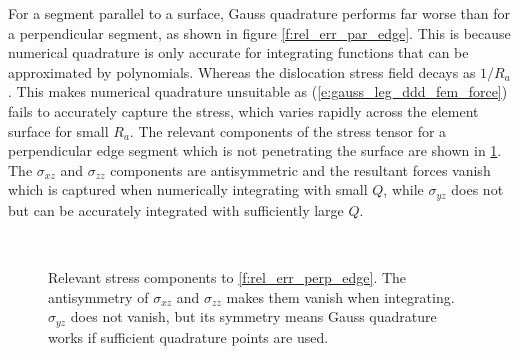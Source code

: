 \documentclass[11pt]{iopart}
\begin{document}
For a segment parallel to a surface, Gauss quadrature performs far worse than for a perpendicular segment, as shown in figure \ref{f:rel_err_par_edge}. This is because numerical quadrature is only accurate for integrating functions that can be approximated by polynomials. Whereas the dislocation stress field \cite{Cai2006} decays as $1/R_{a}$. This makes numerical quadrature unsuitable as (\ref{e:gauss_leg_ddd_fem_force}) fails to accurately capture the stress, which varies rapidly across the element surface for small $R_a$. The relevant components of the stress tensor for a perpendicular edge segment which is not penetrating the surface are shown in \cref{f:sigma_perp_edge}. The $\sigma_{xz}$ and $\sigma_{zz}$ components are antisymmetric and the resultant forces vanish which is captured when numerically integrating with small $Q$, while $\sigma_{yz}$ does not but can be accurately integrated with sufficiently large $Q$.

\begin{figure}[t]
    \centering
    ~
    ~
    \caption{Relevant stress components to \cref{f:rel_err_perp_edge}. The antisymmetry of $\sigma_{xz}$ and $\sigma_{zz}$ makes them vanish when integrating. $\sigma_{yz}$ does not vanish, but its symmetry means Gauss quadrature works if sufficient quadrature points are used.}
    \label{f:sigma_perp_edge}
\end{figure}
\end{document}
